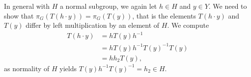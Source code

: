 \documentclass[12nt]{article}
\theoremstyle{plain}
\begin{document}



In general with $H$ a normal subgroup, we again let $h \in H$ and $y \in Y$. We need to show that $\pi_G(T(h \cdot y)) = \pi_G(T(y))$, that is the elements $T(h \cdot y)$ and $T(y)$ differ by left multiplication by an element of $H$. We compute
\begin{align*}
T(h \cdot y) &= hT(y)h^{-1} \\
	&= h T(y) h^{-1}T(y)^{-1}T(y) \\
	&= h h_2 T(y),
\end{align*}
as normality of $H$ yields $T(y)h^{-1}T(y)^{-1} = h_2 \in H$. 
\end{document}
